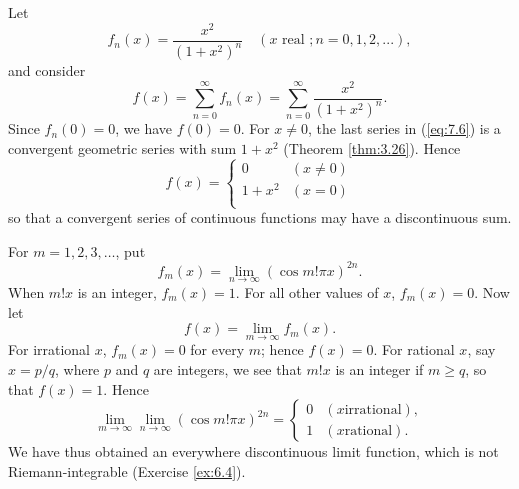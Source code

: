 \begin{newexample}
    Let
    \begin{equation*}
        f_n (x) = \frac{x^2}{(1+x^2)^n}
        \quad
        (x \text{ real }; n = 0,1,2,...),
    \end{equation*}
    and consider
    \begin{equation}
        \label{eq:7.6}
        f(x) =
        \sum_{n=0}^{\infty} f_n (x) =
        \sum_{n=0}^{\infty} \frac{x^2}{(1+x^2)^n} .
    \end{equation}
    Since $f_n(0)=0$, we have $f(0) = 0$.
    For $x \neq 0$, the last series in (\ref{eq:7.6}) is a convergent
    geometric series with sum $1+x^2$ (Theorem \ref{thm:3.26}).
    Hence
    \begin{equation}
        \label{eq:7.7}
        f(x) = \left\{
        \begin{array}{ll}
            0       & (x \neq 0) \\
            1 + x^2 & (x =    0) \\
        \end{array}
        \right.
    \end{equation}
    so that a convergent series of continuous functions may have a discontinuous sum.
\end{newexample}

\begin{newexample}
    For $m = 1,2,3,\dots$, put
    \begin{equation*}
        f_m(x) = \lim_{n \to \infty} (\cos m! \pi x)^{2n}.
    \end{equation*}
    When $m!x$ is an integer, $f_m(x) = 1$.
    For all other values of $x$, $f_m(x) = 0$.
    Now let
    \begin{equation*}
        f(x) = \lim_{m \to \infty} f_m (x).
    \end{equation*}
    For irrational $x$, $f_m(x) = 0$ for every $m$; hence $f(x) = 0$.
    For rational $x$, say $x = p/q$, where $p$ and $q$ are integers,
    we see that $m!x$ is an integer if $m \geq q$, so that $f(x) = 1$.
    Hence
    \begin{equation}
        \label{eq:7.8}
        \lim_{m \to \infty} \lim_{n \to \infty} (\cos m!\pi x)^{2n} =
        \left\{
        \begin{array}{ll}
            0 & (x \text{irrational}), \\
            1 & (x \text{rational}).
        \end{array}
        \right.
    \end{equation}
    We have thus obtained an everywhere discontinuous limit function, which
    is not Riemann-integrable (Exercise \ref{ex:6.4}).
\end{newexample}

